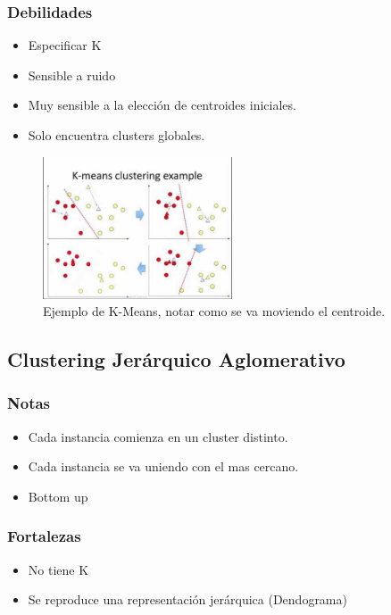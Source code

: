 \documentclass[titlepage,a4paper]{article}
\begin{document}
\subsubsection*{Debilidades}
\begin{itemize}
    \item Especificar K
    \item Sensible a ruido
    \item Muy sensible a la elección de centroides iniciales.
    \item Solo encuentra clusters globales.
\end{itemize}


\begin{figure}[!htb]
    \centering
    \includegraphics[width=0.5\textwidth]{imagenesResumen/K-Means.jpg}
    \caption{Ejemplo de K-Means, notar como se va moviendo el centroide.}
\end{figure}

\newpage

\subsection{Clustering Jerárquico Aglomerativo}
\subsubsection*{Notas}
\begin{itemize}
    \item Cada instancia comienza en un cluster distinto.
    \item Cada instancia se va uniendo con el mas cercano.
    \item Bottom up
\end{itemize}

\subsubsection*{Fortalezas}
\begin{itemize}
    \item No tiene K
    \item Se reproduce una representación jerárquica (Dendograma)
\end{itemize}
\end{document}
